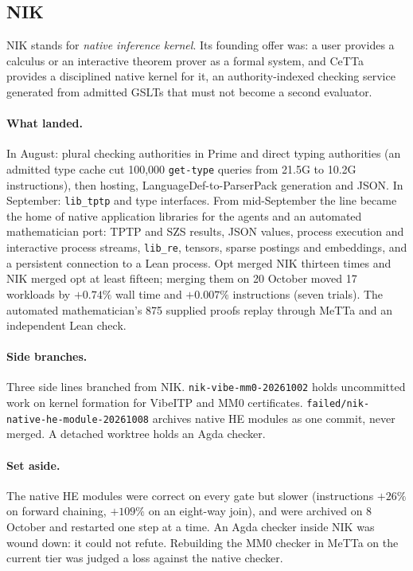 \documentclass[11pt]{article}
\newcommand{\code}[1]{\texttt{#1}}
\newcommand{\HE}{\textup{HE}}
\newcommand{\CeTTa}{\textup{CeTTa}}
\begin{document}
\subsection{NIK}
\label{sec:line-nik}

NIK stands for \emph{native inference kernel}.  Its founding offer was: a
user provides a calculus or an interactive theorem prover as a formal system,
and \CeTTa{} provides a disciplined native kernel for it, an
authority-indexed checking service generated from admitted GSLTs that must
not become a second evaluator.

\paragraph{What landed.}  In August: plural checking authorities in Prime and
direct typing authorities (an admitted type cache cut 100{,}000
\code{get-type} queries from 21.5G to 10.2G instructions), then hosting,
LanguageDef-to-ParserPack generation and JSON.  In September:
\code{lib\_tptp} and type interfaces.  From mid-September the line became the
home of native application libraries for the agents and an automated
mathematician port: TPTP and SZS results, JSON values, process execution and
interactive process streams, \code{lib\_re}, tensors, sparse postings and
embeddings, and a persistent connection to a Lean process.  Opt merged NIK
thirteen times and NIK merged opt at least fifteen; merging them on
20 October moved 17 workloads by $+0.74\%$ wall time and $+0.007\%$
instructions (seven trials).  The automated mathematician's 875 supplied
proofs replay through MeTTa and an independent Lean check.

\paragraph{Side branches.}  Three side lines branched from NIK.
\code{nik-vibe-mm0-20261002} holds uncommitted work on kernel formation for
VibeITP and MM0 certificates.  \code{failed/nik-native-he-module-20261008}
archives native \HE{} modules as one commit, never merged.  A detached
worktree holds an Agda checker.

\paragraph{Set aside.}  The native \HE{} modules were correct on every gate but
slower (instructions $+26\%$ on forward chaining, $+109\%$ on an eight-way
join), and were archived on 8 October and restarted one step at a time.  An
Agda checker inside NIK was wound down: it could not refute.  Rebuilding the
MM0 checker in MeTTa on the current tier was judged a loss against the native
checker.
\end{document}
